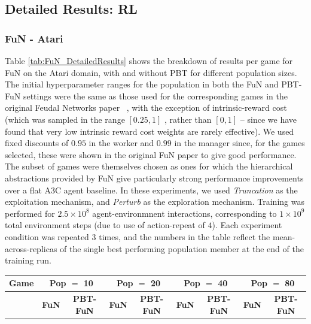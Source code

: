 \documentclass{article} %
\begin{document}
\begin{appendices}
\subsection{Detailed Results: RL}\label{sec:detailed_results_RL}


\subsubsection*{FuN - Atari}

Table \ref{tab:FuN_DetailedResults} shows the breakdown of results per game for FuN on the Atari domain, with and without PBT for different population sizes. The initial hyperparameter ranges for the population in both the FuN and PBT-FuN settings were the same as those used for the corresponding games in the original Feudal Networks paper ~\citep{vezhnevets2017feudal}, with the exception of intrinsic-reward cost (which was sampled in the range $[0.25, 1]$ , rather than $[0,1]$ -- since we have found that very low intrinsic reward cost weights are rarely effective). We used fixed discounts of $0.95$ in the worker and $0.99$ in the manager since, for the games selected, these were shown in the original FuN paper to give good performance. The subset of games were themselves chosen as ones for which the hierarchical abstractions provided by FuN give particularly strong performance improvements over a flat A3C agent baseline. In these experiments, we used \emph{Truncation} as the exploitation mechanism, and \emph{Perturb} as the exploration mechanism. Training was performed for $2.5\times 10^8$ agent-environmnent interactions, corresponding to $1\times 10^9$ total environment steps (due to use of action-repeat of $4$). Each experiment condition was repeated $3$ times, and the numbers in the table reflect the mean-across-replicas of the single best performing population member at the end of the training run.

\begin{table}[h]
\scriptsize
    \begin{center}
    \begin{tabular}
    {lcccccccc}
    \toprule
      \textbf{Game}  & \multicolumn{2}{c}{\textbf{Pop $=$ 10 }} &\multicolumn{2}{c}{\textbf{Pop $=$ 20 }} & \multicolumn{2}{c}{\textbf{Pop $=$ 40 }} & \multicolumn{2}{c}{\textbf{Pop $=$ 80 }} \\ 
    \midrule
    & \textbf{FuN} & \textbf{PBT-FuN}  & \textbf{FuN} & \textbf{PBT-FuN}  & \textbf{FuN} & \textbf{PBT-FuN}  & \textbf{FuN} & \textbf{PBT-FuN} \\ 
    

\end{tabular}
\end{center}
\end{table}
\end{appendices}
\end{document}
